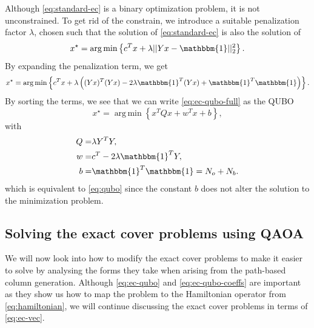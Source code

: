 \documentclass{article}
\newcommand{\argmin}{\operatorname*{arg\,min}}
\newcommand{\vone}{\mathbbm{1}}
\begin{document}
Although \eqref{eq:standard-ec} is a binary optimization problem, it is not unconstrained. 
To get rid of the constrain, we introduce a suitable penalization factor $\lambda$, chosen such that the solution of \eqref{eq:standard-ec} is also the solution of
\begin{equation}
    x^\star = \argmin \left\{ c^T x + \lambda ||Y x - \mathbbm{1}||_2^2 \right\}.
    \label{eq:ec-vec}
\end{equation}
By expanding the penalization term, we get
\begin{equation}
    x^\star = \argmin \left\{ c^T x + \lambda \left((Yx)^T (Yx) - 2\lambda \vone^T(Yx) + \vone^T \vone \right) \right\}.
    \label{eq:ec-qubo-full}
\end{equation}
By sorting the terms, we see that we can write \eqref{eq:ec-qubo-full} as the QUBO
\begin{equation}
    x^\star = \argmin \left\{ x^T Q x + w^T x + b \right\},
    \label{eq:ec-qubo}
\end{equation}
with
\begin{subequations}
    \begin{align}
      Q =& \lambda Y^T Y, \label{eq:ec-qubo-coeffs-1}\\
      w =& c^T  - 2 \lambda \vone^T Y, \label{eq:ec-qubo-coeffs-2}\\
      b =& \vone^T \vone = N_o + N_b. \label{eq:ec-qubo-coeffs-3}
    \end{align}
    \label{eq:ec-qubo-coeffs}
\end{subequations}
which is equivalent to \eqref{eq:qubo} since the constant $b$ does not alter the solution to the minimization problem.


\subsection{Solving the exact cover problems using QAOA}
\label{sec:ec-pruning}

We will now look into how to modify the exact cover problems to make it easier to solve by analysing the forms they take when arising from the path-based column generation. 
Although \eqref{eq:ec-qubo} and \eqref{eq:ec-qubo-coeffs} are important as they show us how to map the problem to the Hamiltonian operator from \eqref{eq:hamiltonian}, we will continue discussing the exact cover problems in terms of \eqref{eq:ec-vec}.
\end{document}
